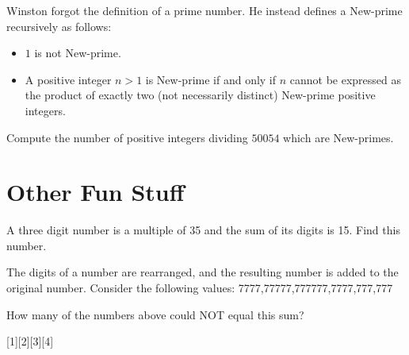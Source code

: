 \begin{problem}
    Winston forgot the definition of a prime number. He instead defines a New-prime recursively as follows:
\begin{itemize}
    \item \(1\) is not New-prime.
    \item A positive integer \( n > 1 \) is New-prime if and only if \( n \) cannot be expressed as the product of exactly two (not necessarily distinct) New-prime positive integers.
\end{itemize}
Compute the number of positive integers dividing \(50054\) which are New-primes.

\end{problem}


\section{Other Fun Stuff}\setcounter{problem}{0}


\begin{problem}
    A three digit number is a multiple of 35 and the sum of its digits is 15. Find this number.
\end{problem}

\begin{problem}
    The digits of a number are rearranged, and the resulting number is added to the original number. Consider the following values:\smallbreak
    \hspace{25pt}777\hfill7,777\hfill77,777\hfill777,777\hfill7,777,777\hspace{25pt}\smallbreak

    How many of the numbers above could NOT equal this sum?
    \end{problem}
    [1][2][3][4]

